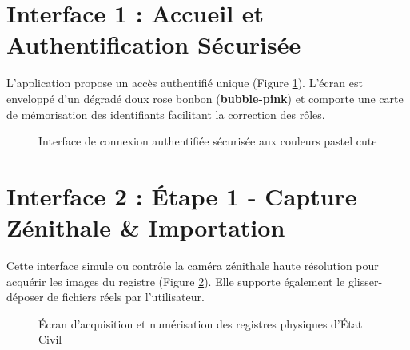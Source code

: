 \documentclass[12pt,a4paper,oneside]{report}
\begin{document}
\section{Interface 1 : Accueil et Authentification Sécurisée}
L'application propose un accès authentifié unique (Figure \ref{fig:screen_login}). L'écran est enveloppé d'un dégradé doux rose bonbon (\textbf{bubble-pink}) et comporte une carte de mémorisation des identifiants facilitant la correction des rôles.
\begin{figure}[H]
    \centering
    \caption{Interface de connexion authentifiée sécurisée aux couleurs pastel cute}
    \label{fig:screen_login}
\end{figure}

\section{Interface 2 : Étape 1 - Capture Zénithale \& Importation}
Cette interface simule ou contrôle la caméra zénithale haute résolution pour acquérir les images du registre (Figure \ref{fig:screen_capture}). Elle supporte également le glisser-déposer de fichiers réels par l'utilisateur.
\begin{figure}[H]
    \centering
    \caption{Écran d'acquisition et numérisation des registres physiques d'État Civil}
    \label{fig:screen_capture}
\end{figure}
\end{document}
